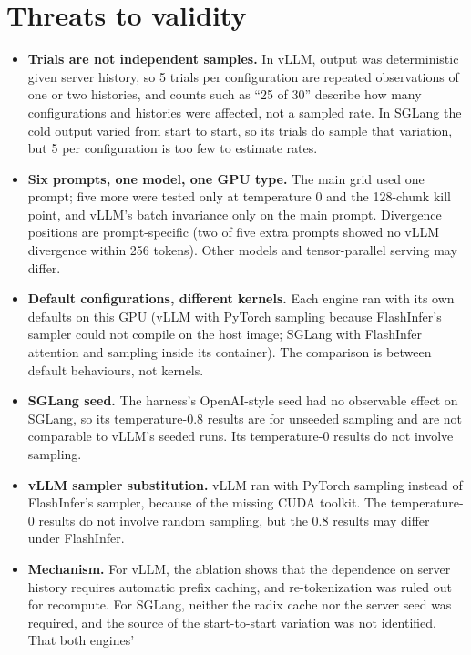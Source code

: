 \documentclass[10pt,twocolumn]{article}
\begin{document}
\section{Threats to validity}
\label{sec:threats}

\begin{itemize}
  \item \textbf{Trials are not independent samples.} In vLLM, output was
    deterministic given server history, so 5 trials per configuration are
    repeated observations of one or two histories, and counts such as ``25
    of 30'' describe how many configurations and histories were affected,
    not a sampled rate. In SGLang the cold output varied from start to
    start, so its trials do sample that variation, but 5 per configuration
    is too few to estimate rates.
  \item \textbf{Six prompts, one model, one GPU type.} The main grid used
    one prompt; five more were tested only at temperature 0 and the
    128-chunk kill point, and vLLM's batch invariance only on the main
    prompt. Divergence positions are prompt-specific (two of five extra
    prompts showed no vLLM divergence within 256 tokens). Other models and
    tensor-parallel serving may differ.
  \item \textbf{Default configurations, different kernels.} Each engine
    ran with its own defaults on this GPU (vLLM with PyTorch sampling
    because FlashInfer's sampler could not compile on the host image;
    SGLang with FlashInfer attention and sampling inside its container).
    The comparison is between default behaviours, not kernels.
  \item \textbf{SGLang seed.} The harness's OpenAI-style seed had no
    observable effect on SGLang, so its temperature-0.8 results are for
    unseeded sampling and are not comparable to vLLM's seeded runs.
    Its temperature-0 results do not involve sampling.
  \item \textbf{vLLM sampler substitution.} vLLM ran with PyTorch sampling
    instead of FlashInfer's sampler, because of the missing CUDA toolkit. The
    temperature-0 results do not involve random sampling, but the 0.8
    results may differ under FlashInfer.
  \item \textbf{Mechanism.} For vLLM, the ablation shows that the
    dependence on server history requires automatic prefix caching, and
    re-tokenization was ruled out for recompute. For SGLang, neither the
    radix cache nor the server seed was required, and the source of the
    start-to-start variation was not identified. That both engines'

\end{itemize}
\end{document}
